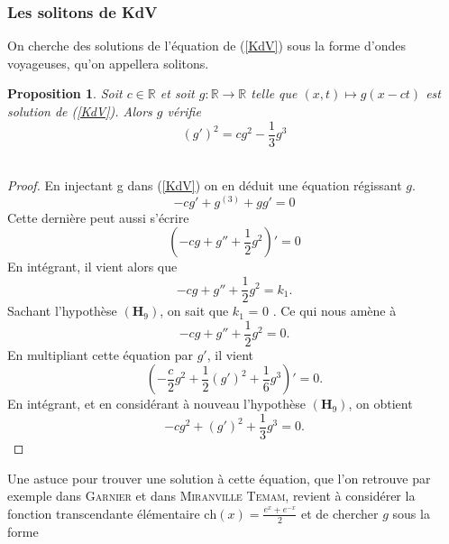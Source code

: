 \documentclass[12pt,a4paper]{article}
\newtheorem{prop}[dfn]{\textbf{Proposition}}
\numberwithin{equation}{section}
\begin{document}
\subsubsection{Les solitons de KdV}
On cherche des solutions de l'équation de (\ref{KdV}) sous la forme d'ondes voyageuses, qu'on appellera solitons. 
\begin{prop}
    Soit $c \in \mathbb{R}$ et soit $g:\mathbb{R}\rightarrow\mathbb{R}$ telle que $ (x,t)\mapsto g(x - ct)$ est solution de (\ref{KdV}). Alors $g$ vérifie
    \begin{equation}
     (g')^2  = cg^2 - \frac{1}{3}g^3 \label{eq_soliton}
    \end{equation}\\
\end{prop}
\begin{proof}
    En injectant g dans (\ref{KdV}) on en déduit une équation régissant $g$.
\begin{equation*}
    -cg' + g^{(3)} + gg' = 0 
\end{equation*}
Cette dernière peut aussi s'écrire
\begin{equation*}
    \left(-cg + g'' + \frac{1}{2}g^2\right)' = 0 
\end{equation*}
En intégrant, il vient alors que
\begin{equation*}
        -cg + g'' + \frac{1}{2}g^2 = k_1.
\end{equation*}
Sachant l'hypothèse $(\textbf{H}_9)$, on sait que $k_1$ = 0 . Ce qui nous amène à 
\begin{equation*}
        -cg + g'' + \frac{1}{2}g^2 = 0.
\end{equation*}
En multipliant cette équation par $g'$, il vient 
\begin{equation*}
        \left(-\frac{c}{2}g^2 + \frac{1}{2}(g')^2 + \frac{1}{6}g^3\right)' = 0.
\end{equation*}
En intégrant, et en considérant à nouveau l'hypothèse $(\textbf{H}_9)$, on obtient
\begin{equation*}
     -cg^2 + (g')^2 + \frac{1}{3}g^3 = 0.
\end{equation*}
\end{proof}

Une astuce pour trouver une solution à cette équation, que l'on retrouve par exemple dans \textsc{Garnier}\cite{Garnier} et dans \textsc{Miranville Temam\cite{MT}}, revient à considérer la fonction transcendante élémentaire $\text{ch}(x) = \frac{e^x+ e^{-x}}{2}$ et de chercher $g$ sous la forme 
\end{document}
